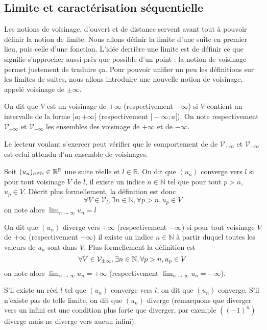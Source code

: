 \subsection{Limite et caractérisation séquentielle}

Les notions de voisinage, d'ouvert et de distance servent avant tout à pouvoir définir la notion de limite. Nous allons définir la limite d'une suite en premier lieu, puis celle d'une fonction. L'idée derrière une limite est de définir ce que signifie \og s'approcher aussi près que possible d'un point\fg{} : la notion de voisinage permet justement de traduire ça. Pour pouvoir unifier un peu les définitions sur les limites de suites, nous allons introduire une nouvelle notion de voisinage, appelé voisinage de $\pm \infty$.

\begin{defi}
    On dit que $V$ est un voisinage de $+\infty$ (respectivement $-\infty$) si $V$ contient un intervalle de la forme $]a;+\infty[$ (respectivement $]-\infty;a[$). On note respectivement $\mathcal V_{+\infty}$ et $\mathcal V_{-\infty}$ les ensembles des voisinage de $+\infty$ et de $-\infty$.
\end{defi}

Le lecteur voulant s'exercer peut vérifier que le comportement de de $\mathcal V_{+\infty}$ et $\mathcal V_{-\infty}$ est celui attendu d'un ensemble de voisinages.

\begin{defi}
    Soit $(u_n)_{n\in\mathbb{N}}\in\mathbb R^{\mathbb{N}}$ une suite réelle et $l\in\mathbb R$. On dit que $(u_n)$ converge vers $l$ si pour tout voisinage $V$ de $l$, il existe un indice $n\in\mathbb N$ tel que pour tout $p> n$, $u_p\in V$. Décrit plus formellement, la définition est donc $$\forall V\in\mathcal V_l, \exists n\in\mathbb N,\forall p > n, u_p\in V$$ on note alors $\displaystyle{\lim_{n\to\infty} u_n = l}$

    On dit que $(u_n)$ diverge vers $+\infty$ (respectivement $-\infty$) si pour tout voisinage $V$ de $+\infty$ (respectivement $-\infty$) il existe un indice $n\in\mathbb N$ à partir duquel toutes les valeurs de $u_n$ sont dans $V$. Plus formellement la définition est $$\forall V\in\mathcal V_{\pm\infty},\exists n\in\mathbb{N}, \forall p > n, u_p\in V$$ on note alors $\displaystyle{\lim_{n\to\infty} u_n = +\infty}$ (respectivement $\displaystyle{\lim_{n\to\infty} u_n = -\infty}$).
\end{defi}

\begin{rmk}
    S'il existe un réel $l$ tel que $(u_n)$ converge vers $l$, on dit que $(u_n)$ converge. S'il n'existe pas de telle limite, on dit que $(u_n)$ diverge (remarquons que diverger vers un infini est une condition plus forte que diverger, par exemple $((-1)^n)$ diverge mais ne diverge vers aucun infini).
\end{rmk}

